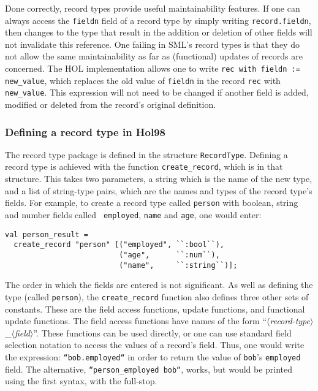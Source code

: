 \documentclass[12pt,fleqn,a4paper]{report}
\begin{document}
Done correctly, record types provide useful maintainability features.
If one can always access the {\tt fieldn} field of a record type by
simply writing {\tt record.fieldn}, then changes to the type that
result in the addition or deletion of other fields will not invalidate
this reference.  One failing in SML's record types is that they do not
allow the same maintainability as far as (functional) updates of
records are concerned.  The HOL implementation allows one to write
{\tt rec with fieldn := new\_value}, which replaces the old value of
{\tt fieldn} in the record {\tt rec} with {\tt new\_value}.  This
expression will not need to be changed if another field is added,
modified or deleted from the record's original definition.

\subsubsection{Defining a record type in Hol98}

\newcommand{\createrec}{{\tt create\_record}} The record type package
is defined in the structure {\tt RecordType}.  Defining a record type
is achieved with the function \createrec, which is in that structure.
This takes two parameters, a string which is the name of the new type,
and a list of string-type pairs, which are the names and types of the
record type's fields.  For example, to create a record type called
{\tt person} with boolean, string and number fields called {\tt
  employed}, {\tt name} and {\tt age}, one would enter:
\begin{verbatim}
val person_result =
  create_record "person" [("employed", ``:bool``),
                          ("age",      ``:num``),
                          ("name",     ``:string``)];
\end{verbatim}
The order in which the fields are entered is not significant. As well
as defining the type (called {\tt person}), the \createrec{} function
also defines three other sets of constants.  These are the field
access functions, update functions, and functional update functions.
The field access functions have names of the form
``$\langle$\textsl{record-type\/}$\rangle$\_$\langle$\textsl{field\/}$\rangle$''.
These functions can be used directly, or one can use standard field
selection notation to access the values of a record's field.  Thus,
one would write the expression: \mbox{\tt ``bob.employed``} in order
to return the value of {\tt bob}'s {\tt employed} field.  The
alternative, \texttt{``person\_employed bob``}, works, but would be
printed using the first syntax, with the full-stop.
\end{document}

